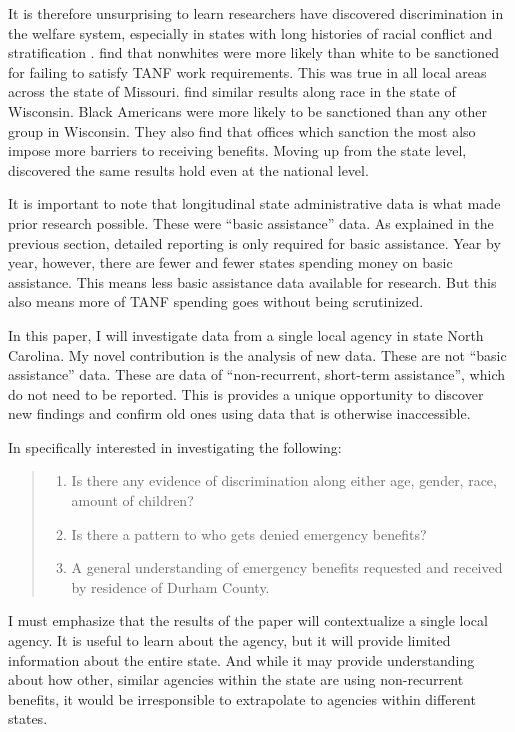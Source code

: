 \documentclass[12pt,letterpaperpaper,]{book}
\providecommand{\tightlist}{%
  \setlength{\itemsep}{0pt}\setlength{\parskip}{0pt}}
\begin{document}
It is therefore unsurprising to learn researchers have discovered
discrimination in the welfare system, especially in states with long
histories of racial conflict and stratification
\citep{mannix_tanf_2013}. \citet{keiser_race_2004} find that nonwhites
were more likely than white to be sanctioned for failing to satisfy TANF
work requirements. This was true in all local areas across the state of
Missouri. \citet{wu_how_2006} find similar results along race in the
state of Wisconsin. Black Americans were more likely to be sanctioned
than any other group in Wisconsin. They also find that offices which
sanction the most also impose more barriers to receiving benefits.
Moving up from the state level, \citet{monnat_color_2010} discovered the
same results hold even at the national level.

It is important to note that longitudinal state administrative data is
what made prior research possible. These were ``basic assistance'' data.
As explained in the previous section, detailed reporting is only
required for basic assistance. Year by year, however, there are fewer
and fewer states spending money on basic assistance. This means less
basic assistance data available for research. But this also means more
of TANF spending goes without being scrutinized.

In this paper, I will investigate data from a single local agency in
state North Carolina. My novel contribution is the analysis of new data.
These are not ``basic assistance'' data. These are data of
``non-recurrent, short-term assistance'', which do not need to be
reported. This is provides a unique opportunity to discover new findings
and confirm old ones using data that is otherwise inaccessible.

In specifically interested in investigating the following:

\begin{quote}
\begin{enumerate}
\def\labelenumi{\arabic{enumi}.}
\tightlist
\item
  Is there any evidence of discrimination along either age, gender,
  race, amount of children?
\item
  Is there a pattern to who gets denied emergency benefits?
\item
  A general understanding of emergency benefits requested and received
  by residence of Durham County.
\end{enumerate}
\end{quote}

I must emphasize that the results of the paper will contextualize a
single local agency. It is useful to learn about the agency, but it will
provide limited information about the entire state. And while it may
provide understanding about how other, similar agencies within the state
are using non-recurrent benefits, it would be irresponsible to
extrapolate to agencies within different states.
\end{document}

